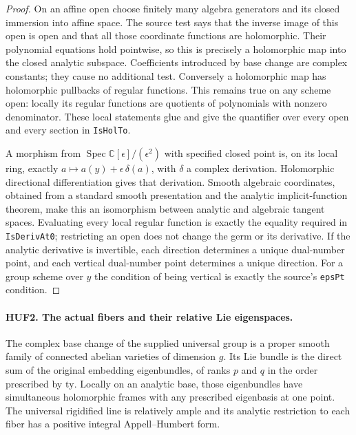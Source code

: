 \documentclass[11pt,a4paper]{article}
\numberwithin{equation}{section}
\theoremstyle{remark}\newtheorem{remark}[theorem]{Remark}
\begin{document}
\begin{proof}
On an affine open choose finitely many algebra generators and its
closed immersion into affine space.  The source test says that the
inverse image of this open is open and that all those coordinate
functions are holomorphic.  Their polynomial equations hold pointwise,
so this is precisely a holomorphic map into the closed analytic
subspace.  Coefficients introduced by base change are complex
constants; they cause no additional test.  Conversely a holomorphic
map has holomorphic pullbacks of regular functions.  This remains true
on any scheme open: locally its regular functions are quotients of
polynomials with nonzero denominator.  These local statements glue
and give the quantifier over every open and every section in
\texttt{Is\allowbreak Hol\allowbreak To}.

A morphism from \(\operatorname{Spec}\mathbb C[\epsilon]/(\epsilon^2)\)
with specified closed point is, on its local ring, exactly
\(a\mapsto a(y)+\epsilon\,\delta(a)\), with \(\delta\) a complex
derivation.  Holomorphic directional differentiation gives that
derivation.  Smooth algebraic coordinates, obtained from a standard
smooth presentation and the analytic implicit-function theorem, make
this an isomorphism between analytic and algebraic tangent spaces.
Evaluating every local regular function is exactly the equality
required in \texttt{Is\allowbreak Deriv\allowbreak At0}; restricting an open does not change
the germ or its derivative.  If the analytic derivative is invertible,
each direction determines a unique dual-number point, and each
vertical dual-number point determines a unique direction.
For a group scheme over \(y\) the condition of being vertical is
exactly the source's \texttt{eps\allowbreak Pt} condition.
\end{proof}

\paragraph{HUF2. The actual fibers and their relative Lie eigenspaces.}
\label{claim:HUF2}
The complex base change of the supplied universal group is a proper
smooth family of connected abelian varieties of dimension \(g\).
Its Lie bundle is the direct sum of the original embedding
eigenbundles, of ranks \(p\) and \(q\) in the order prescribed
by \(\mathrm{ty}\).  Locally on an analytic base, those eigenbundles
have simultaneous holomorphic frames with any prescribed eigenbasis
at one point.  The universal rigidified line is relatively ample
and its analytic restriction to each fiber has a positive integral
Appell--Humbert form.
\end{document}
